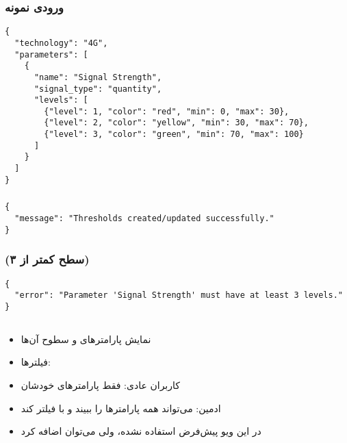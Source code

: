 \documentclass{report}
\begin{document}
\subsubsection{ ورودی نمونه}
\begin{latin}
\begin{lstlisting}[style=jsonstyle]
{
  "technology": "4G",
  "parameters": [
    {
      "name": "Signal Strength",
      "signal_type": "quantity",
      "levels": [
        {"level": 1, "color": "red", "min": 0, "max": 30},
        {"level": 2, "color": "yellow", "min": 30, "max": 70},
        {"level": 3, "color": "green", "min": 70, "max": 100}
      ]
    }
  ]
}
\end{lstlisting}
\end{latin}

\subsubsection{}
\begin{latin}
\begin{lstlisting}[style=jsonstyle]
{
  "message": "Thresholds created/updated successfully."
}
\end{lstlisting}
\end{latin}

\subsubsection{ (سطح کمتر از ۳)}
\begin{latin}
\begin{lstlisting}[style=jsonstyle]
{
  "error": "Parameter 'Signal Strength' must have at least 3 levels."
}
\end{lstlisting}
\end{latin}

\subsection{}
\begin{itemize}
    \item نمایش پارامترهای  و سطوح آن‌ها
    \item فیلترها: 
    \item کاربران عادی: فقط پارامترهای خودشان
    \item ادمین: می‌تواند همه پارامترها را ببیند و با  فیلتر کند
    \item {} در این ویو پیش‌فرض استفاده نشده، ولی می‌توان اضافه کرد
\end{itemize}
\end{document}
